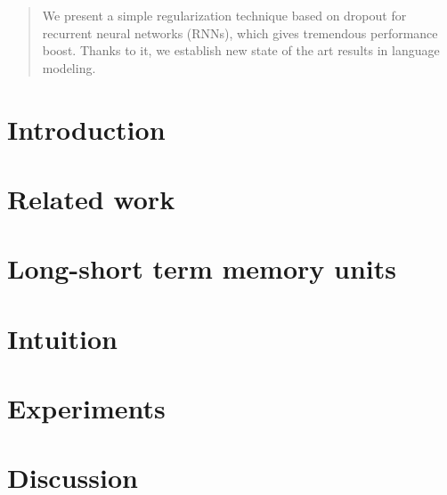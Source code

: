 \documentclass{article}
\begin{document}
 


\begin{abstract} 
  We present a simple regularization technique based on dropout for recurrent
  neural networks (RNNs), which gives tremendous performance boost.
  Thanks to it, we establish new state of the art results in language modeling.

\end{abstract} 

\section{Introduction}

\section{Related work}

\section{Long-short term memory units}

\section{Intuition}

\section{Experiments}


\section{Discussion}



\end{document}
